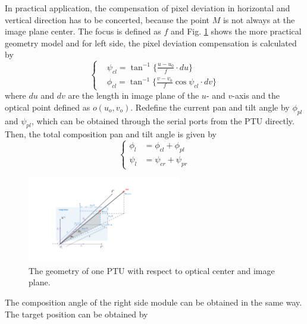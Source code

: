 In practical application, the compensation of pixel deviation in horizontal and vertical direction has to be concerted, because the point $M$ is not always at the image plane center. The focus is defined as $f$ and Fig. \ref{fig:Fig02_ImagePlaneOnly} shows the more practical geometry model and for left side, the pixel deviation compensation is calculated by
\begin{equation} 
	\left \{
	\begin{split}
		& \psi_{cl} = \tan^{-1} \{ \frac{u-u_0}{f} \cdot du \} \\
		& \phi_{cl} = \tan^{-1} \{ \frac{v-v_0}{f} \cos\psi_{cl} \cdot dv \} 
	\end{split}
	\right.
\end{equation}
where $du$ and $dv$ are the length in image plane of the $u$- and $v$-axis and the optical point defined as $o(u_o,v_o)$. Redefine the current pan and tilt angle by $\phi_{pl}$ and $\psi_{pl}$, which can be obtained through the serial ports from the PTU directly. Then, the total composition pan and tilt angle is given by
\begin{equation} 
	\left \{
	\begin{split}
		\phi_l &= \phi_{cl} + \phi_{pl} \\ 
		\psi_l &= \psi_{cr} + \psi_{pr}
	\end{split}
	\right.
\end{equation}

\begin{figure}[!th]
	\centering
	\includegraphics[width=0.6\textwidth]{Figs/chp03_vision_02_image_plane.pdf}
	\caption{The geometry of one PTU with respect to optical center and image plane.}
	\label{fig:Fig02_ImagePlaneOnly}
\end{figure}

The composition angle of the right side module can be obtained in the same way. The target position can be obtained by

